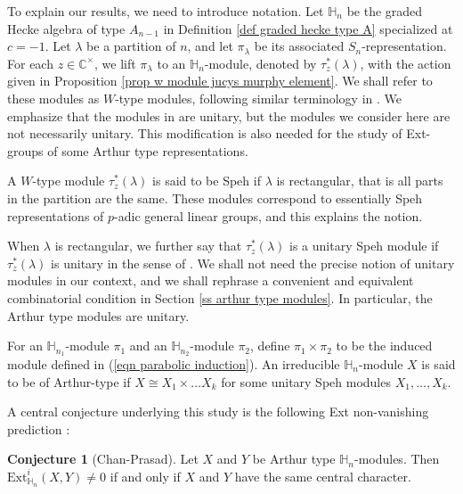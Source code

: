 \documentclass[11pt]{amsart}
\numberwithin{equation}{section}
\theoremstyle{definition}
\newtheorem{conjecture}[thm]{Conjecture}
\begin{document}
To explain our results, we need to introduce notation. Let $\mathbb H_n$ be the graded Hecke algebra of type $A_{n-1}$ in Definition \ref{def graded hecke type A} specialized at $c=-1$. Let $\lambda$ be a partition of $n$, and let $\pi_{\lambda}$ be its associated $S_n$-representation. For each $z \in \mathbb C^{\times}$, we lift $\pi_{\lambda}$ to an $\mathbb H_n$-module, denoted by $\tau^*_z(\lambda)$, with the action given in Proposition \ref{prop w module jucys murphy element}. We shall refer to these modules as $W$-type modules, following  similar terminology in \cite{babasical1999Ktype}. We emphasize that the modules in \cite{babasical1999Ktype} are unitary, but the modules we consider here are not necessarily unitary. This modification is also needed for the study of Ext-groups of some Arthur type representations.

A $W$-type module $\tau^*_z(\lambda)$ is said to be Speh if $\lambda$ is rectangular, that is all parts in the partition are the same. These modules correspond to essentially Speh representations of $p$-adic general linear groups, and this explains the notion.

When $\lambda$ is rectangular, we further say that $\tau^*_z(\lambda)$ is a unitary Speh module if $\tau^*_z(\lambda)$ is unitary in the sense of \cite[Section 2.5]{barbaschciubotrapa}. We shall not need the precise notion of unitary modules in our context, and we shall rephrase a convenient and equivalent combinatorial condition in Section \ref{ss arthur type modules}. In particular, the Arthur type modules are unitary.

For an $\mathbb H_{n_1}$-module $\pi_1$ and an $\mathbb H_{n_2}$-module $\pi_2$, define $\pi_1 \times \pi_2$ to be the induced module defined in (\ref{eqn parabolic induction}). An irreducible $\mathbb H_n$-module $X$ is said to be of Arthur-type if $X\cong X_1\times \ldots X_k$ for some unitary Speh modules $X_1, \ldots, X_k$.

A central conjecture underlying this study is the following Ext non-vanishing prediction \cite[Conjecture 5.1]{qadri2025extbranch}:

\begin{conjecture}[Chan-Prasad] \label{conj non vanishing Ext}
Let $X$ and $Y$ be Arthur type $\mathbb H_n$-modules. Then $\mathrm{Ext}^i_{\mathbb H_n}(X, Y)\neq 0$ if and only if $X$ and $Y$ have the same central character.
\end{conjecture}
\end{document}
